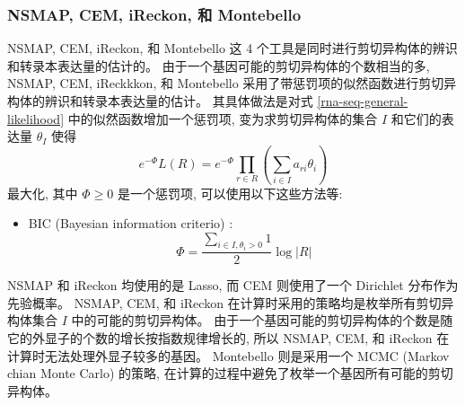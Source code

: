 \subsubsection{NSMAP, CEM, iReckon, 和 Montebello}
\label{intro-nsmap-cem-ireckon-montebllo}

NSMAP, CEM, iReckon, 和 Montebello 这 4 个工具是同时进行剪切异构体的辨识和转录本表达量的估计的。 
由于一个基因可能的剪切异构体的个数相当的多, NSMAP, CEM, iReckkkon, 和 Montebello 
采用了带惩罚项的似然函数进行剪切异构体的辨识和转录本表达量的估计。 
其具体做法是对式 \eqref{rna-seq-general-likelihood} 中的似然函数增加一个惩罚项, 
变为求剪切异构体的集合 $I$ 和它们的表达量 $\theta_I$ 使得
\begin{equation}
e^{-\Phi} L(R) = 
e^{-\Phi}\prod_{r \in R} (\sum_{i \in I} a_{ri} \theta_i)
\end{equation}
最大化, 其中 $\Phi \geq 0$ 是一个惩罚项, 可以使用以下这些方法等: 
\begin{itemize}
\item BIC (Bayesian information criterio) \cite{BIC.Schwarz_1978}: 
\[
\Phi = \frac{\sum_{i \in I, \theta_i>0} 1}{2} \log |R|
\]
\end{itemize}
NSMAP 和 iReckon 均使用的是 Lasso, 
而 CEM 则使用了一个 Dirichlet 分布作为先验概率。
NSMAP, CEM, 和 iReckon 在计算时采用的策略均是枚举所有剪切异构体集合 $I$ 中的可能的剪切异构体。 
由于一个基因可能的剪切异构体的个数是随它的外显子的个数的增长按指数规律增长的, 
所以 NSMAP, CEM, 和 iReckon 在计算时无法处理外显子较多的基因。 
Montebello 则是采用一个 MCMC (Markov chian Monte Carlo) \cite{robert2004monte} 的策略, 
在计算的过程中避免了枚举一个基因所有可能的剪切异构体。 

